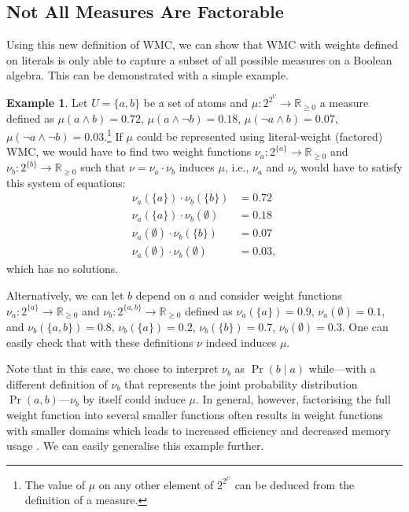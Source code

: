 \documentclass{uai2021} %
\theoremstyle{definition}
\newtheorem{example}{Example}
\begin{document}
\subsection{Not All Measures Are Factorable}

Using this new definition of WMC, we can show that WMC with weights defined on
literals is only able to capture a subset of all possible measures on a
Boolean algebra. This can be demonstrated with a simple example.

\begin{example}
  Let $U = \{a, b\}$ be a set of atoms and $\mu\colon 2^{2^U} \to
  \mathbb{R}_{\ge 0}$ a measure defined as $\mu(a \land b) = 0.72$, $\mu(a \land
  \neg b) = 0.18$, $\mu(\neg a \land b) = 0.07$, $\mu(\neg a \land \neg b) =
  0.03$.\footnote{The value of $\mu$ on any other element of $2^{2^U}$ can be
    deduced from the definition of a measure.} If $\mu$ could be represented
  using literal-weight (factored) WMC, we would have to find two weight
  functions $\nu_a\colon 2^{\{a\}} \to \mathbb{R}_{\ge 0}$ and $\nu_b\colon
  2^{\{b\}} \to \mathbb{R}_{\ge 0}$ such that $\nu = \nu_a \cdot \nu_b$ induces
  $\mu$, i.e., $\nu_a$ and $\nu_b$ would have to satisfy this system of
  equations:
  \begin{align*}
    \nu_a(\{a\}) \cdot \nu_b(\{b\}) &= 0.72 \\
    \nu_a(\{a\}) \cdot \nu_b(\emptyset) &= 0.18 \\
    \nu_a(\emptyset) \cdot \nu_b(\{b\}) &= 0.07 \\
    \nu_a(\emptyset) \cdot \nu_b(\emptyset) &= 0.03,
  \end{align*}
  which has no solutions.

  Alternatively, we can let $b$ depend on $a$ and consider weight functions
  $\nu_a\colon 2^{\{a\}} \to \mathbb{R}_{\ge 0}$ and $\nu_b\colon 2^{\{a, b\}}
  \to \mathbb{R}_{\ge 0}$ defined as $\nu_a(\{a\}) = 0.9$, $\nu_a(\emptyset) =
  0.1$, and $\nu_b(\{a, b\}) = 0.8$, $\nu_b(\{a\}) = 0.2$, $\nu_b(\{b\}) = 0.7$,
  $\nu_b(\emptyset) = 0.3$. One can easily check that with these definitions
  $\nu$ indeed induces $\mu$.
\end{example}

Note that in this case, we chose to interpret $\nu_b$ as $\Pr(b \mid a)$
while---with a different definition of $\nu_b$ that represents the joint
probability distribution $\Pr(a, b)$---$\nu_b$ by itself could induce $\mu$. In
general, however, factorising the full weight function into several smaller
functions often results in weight functions with smaller domains which leads to
increased efficiency and decreased memory usage
\citep{DBLP:conf/aaai/DudekPV20}. We can easily generalise this example further.
\end{document}
